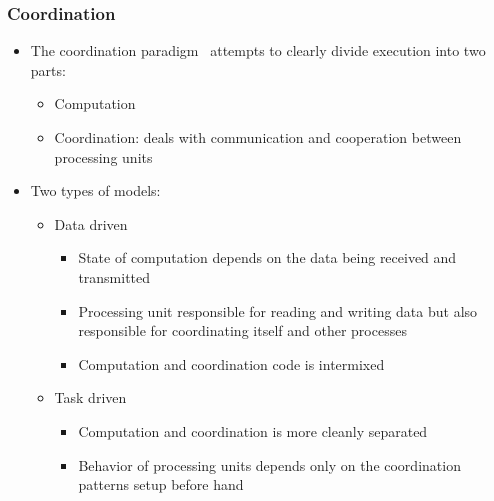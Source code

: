 \documentclass{beamer}
\begin{document}
\frame
{
   \frametitle{Coordination}
   \begin{itemize}
      \item The coordination paradigm~\cite{Papadopoulos98coordinationmodels} attempts to clearly divide execution into two parts:
      \begin{itemize}
         \item Computation
         \item Coordination: deals with communication and cooperation between processing units
      \end{itemize}
      \item Two types of models:
      \begin{itemize}
         \item Data driven
         \begin{itemize}
            \item State of computation depends on the data being received and transmitted
            \item Processing unit responsible for reading and writing data but also responsible for coordinating itself and other processes
            \item Computation and coordination code is intermixed
         \end{itemize}
         \item Task driven
         \begin{itemize}
            \item Computation and coordination is more cleanly separated
            \item Behavior of processing units depends only on the coordination patterns setup before hand
         \end{itemize}
      \end{itemize}
\end{itemize}
}

\end{document}
